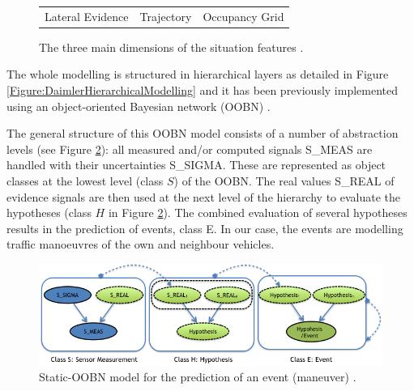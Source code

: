 \begin{figure}
\begin{center}
\begin{tabular}{ccc}
Lateral Evidence & Trajectory & Occupancy Grid \\
\end{tabular}
\caption{\label{Figure:DaimlerSituationFeatures}  The three main dimensions of the situation features \cite{kasper2012object}.}
\end{center}
\end{figure}



The whole modelling is structured in hierarchical layers as detailed in Figure \ref{Figure:DaimlerHierarchicalModelling} and it has been previously implemented \cite{kasper2012object} using an object-oriented Bayesian network (OOBN) \cite{koller1997object}. 




The general structure of this OOBN model consists of a number of abstraction levels (see Figure \ref{Figure:DaimlerOOBNAbstraction}): all measured and/or computed signals S\_MEAS are handled with their uncertainties S\_SIGMA. These are represented as object classes at the lowest level (class $S$) of the OOBN. The real values S\_REAL of evidence signals are then used at the next level of the hierarchy to evaluate the hypotheses (class $H$ in Figure \ref{Figure:DaimlerOOBNAbstraction}). The combined evaluation of several hypotheses results in the prediction of events, class E. In our case, the events are modelling traffic manoeuvres of the own and neighbour vehicles.

\begin{figure}
\begin{center}
\includegraphics[scale=0.58]{./figures/DaimlerOOBNAbstraction}
\caption{\label{Figure:DaimlerOOBNAbstraction} Static-OOBN model for the prediction of an event (maneuver) \cite{Weidl2014}.}
\end{center}
\end{figure}

